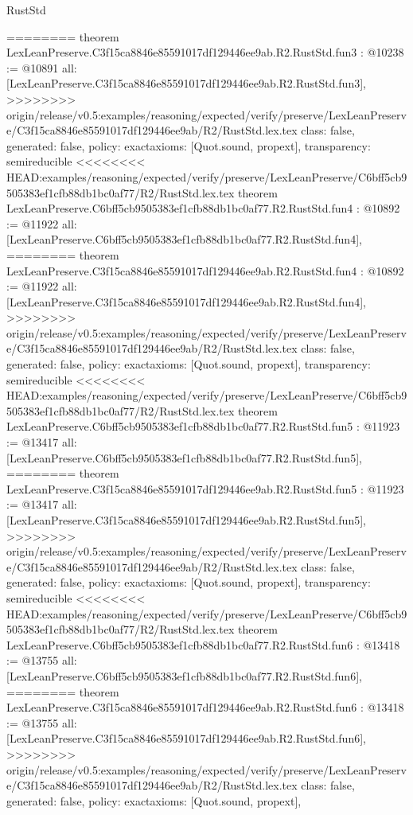 \begin{lexlean}{RustStd}
\begin{coremodule}
{\begin{coremodule}
{{{{{{========
theorem LexLeanPreserve.C3f15ca8846e85591017df129446ee9ab.R2.RustStd.fun3 : @10238 := @10891 {
  all: [LexLeanPreserve.C3f15ca8846e85591017df129446ee9ab.R2.RustStd.fun3],
>>>>>>>> origin/release/v0.5:examples/reasoning/expected/verify/preserve/LexLeanPreserve/C3f15ca8846e85591017df129446ee9ab/R2/RustStd.lex.tex
  class: false,
  generated: false,
  policy: exact{axioms: [Quot.sound, propext]},
  transparency: semireducible
}
<<<<<<<< HEAD:examples/reasoning/expected/verify/preserve/LexLeanPreserve/C6bff5cb9505383ef1cfb88db1bc0af77/R2/RustStd.lex.tex
theorem LexLeanPreserve.C6bff5cb9505383ef1cfb88db1bc0af77.R2.RustStd.fun4 : @10892 := @11922 {
  all: [LexLeanPreserve.C6bff5cb9505383ef1cfb88db1bc0af77.R2.RustStd.fun4],
========
theorem LexLeanPreserve.C3f15ca8846e85591017df129446ee9ab.R2.RustStd.fun4 : @10892 := @11922 {
  all: [LexLeanPreserve.C3f15ca8846e85591017df129446ee9ab.R2.RustStd.fun4],
>>>>>>>> origin/release/v0.5:examples/reasoning/expected/verify/preserve/LexLeanPreserve/C3f15ca8846e85591017df129446ee9ab/R2/RustStd.lex.tex
  class: false,
  generated: false,
  policy: exact{axioms: [Quot.sound, propext]},
  transparency: semireducible
}
<<<<<<<< HEAD:examples/reasoning/expected/verify/preserve/LexLeanPreserve/C6bff5cb9505383ef1cfb88db1bc0af77/R2/RustStd.lex.tex
theorem LexLeanPreserve.C6bff5cb9505383ef1cfb88db1bc0af77.R2.RustStd.fun5 : @11923 := @13417 {
  all: [LexLeanPreserve.C6bff5cb9505383ef1cfb88db1bc0af77.R2.RustStd.fun5],
========
theorem LexLeanPreserve.C3f15ca8846e85591017df129446ee9ab.R2.RustStd.fun5 : @11923 := @13417 {
  all: [LexLeanPreserve.C3f15ca8846e85591017df129446ee9ab.R2.RustStd.fun5],
>>>>>>>> origin/release/v0.5:examples/reasoning/expected/verify/preserve/LexLeanPreserve/C3f15ca8846e85591017df129446ee9ab/R2/RustStd.lex.tex
  class: false,
  generated: false,
  policy: exact{axioms: [Quot.sound, propext]},
  transparency: semireducible
}
<<<<<<<< HEAD:examples/reasoning/expected/verify/preserve/LexLeanPreserve/C6bff5cb9505383ef1cfb88db1bc0af77/R2/RustStd.lex.tex
theorem LexLeanPreserve.C6bff5cb9505383ef1cfb88db1bc0af77.R2.RustStd.fun6 : @13418 := @13755 {
  all: [LexLeanPreserve.C6bff5cb9505383ef1cfb88db1bc0af77.R2.RustStd.fun6],
========
theorem LexLeanPreserve.C3f15ca8846e85591017df129446ee9ab.R2.RustStd.fun6 : @13418 := @13755 {
  all: [LexLeanPreserve.C3f15ca8846e85591017df129446ee9ab.R2.RustStd.fun6],
>>>>>>>> origin/release/v0.5:examples/reasoning/expected/verify/preserve/LexLeanPreserve/C3f15ca8846e85591017df129446ee9ab/R2/RustStd.lex.tex
  class: false,
  generated: false,
  policy: exact{axioms: [Quot.sound, propext]},
}}}}}}}}}}
\end{coremodule}}
\end{coremodule}
\end{lexlean}
